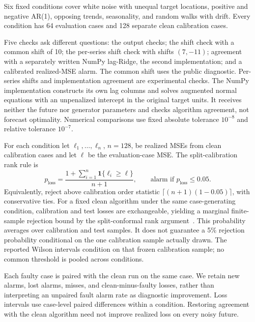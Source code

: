 \documentclass[11pt,a4paper]{article}
\begin{document}
Six fixed conditions cover white noise with unequal target locations,
positive and negative AR(1), opposing trends, seasonality, and random
walks with drift. Every condition has 64 evaluation cases and 128 separate
clean calibration cases.

Five checks ask different questions: the output checks; the shift check
with a common shift of 10; the per-series shift check with
shifts $(7,-11)$; agreement with a separately written NumPy
lag-Ridge, the second implementation; and a calibrated realized-MSE alarm. The common
shift uses the public diagnostic. Per-series shifts and implementation
agreement are experimental checks. The NumPy implementation constructs
its own lag columns and solves augmented normal equations with an
unpenalized intercept in the original target units. It receives neither
the future nor generator parameters and checks algorithm agreement, not
forecast optimality. Numerical comparisons use fixed absolute tolerance
$10^{-8}$ and relative tolerance $10^{-7}$.

For each condition let $\ell_1,\ldots,\ell_n$, $n=128$, be realized MSEs
from clean calibration cases and let $\ell$ be the evaluation-case MSE.
The split-calibration rank rule is
\begin{equation}
 p_{\mathrm{loss}}=\frac{1+\sum_{i=1}^n\mathbf{1}\{\ell_i\geq\ell\}}{n+1},
 \qquad \text{alarm if }p_{\mathrm{loss}}\leq0.05.
 \label{eq:loss-rank}
\end{equation}
Equivalently, reject above calibration order statistic
$\lceil(n+1)(1-0.05)\rceil$, with conservative ties. For a fixed clean
algorithm under the same case-generating condition, calibration and test
losses are exchangeable, yielding a marginal finite-sample rejection
bound by the split-conformal rank argument~\cite{lei2018conformal}.
This probability averages over calibration and test samples. It does not
guarantee a 5\% rejection probability conditional on the one calibration
sample actually drawn. The reported Wilson intervals condition on that
frozen calibration sample; no common threshold is pooled across conditions.

Each faulty case is paired with the clean run on the same case. We retain
new alarms, lost alarms, misses, and clean-minus-faulty losses, rather
than interpreting an unpaired fault alarm rate as diagnostic improvement.
Loss intervals use case-level paired differences within a condition.
Restoring agreement with the clean algorithm need not improve realized
loss on every noisy future.
\end{document}
